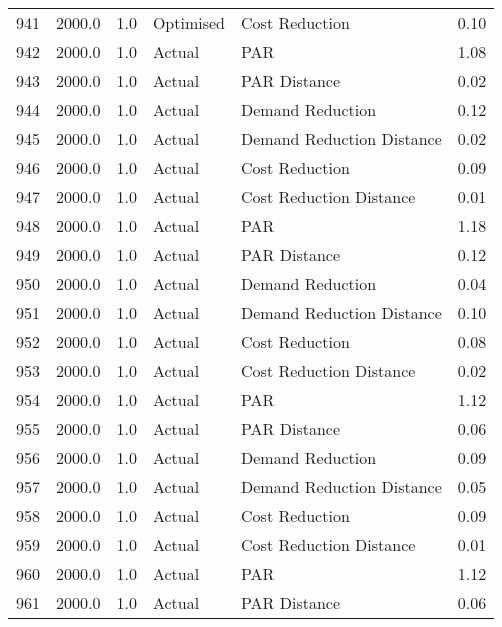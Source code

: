 \begin{longtable}{lrrllr}
941  &       2000.0 &     1.0 &      Optimised &             Cost Reduction &   0.10 \\
942  &       2000.0 &     1.0 &         Actual &                        PAR &   1.08 \\
943  &       2000.0 &     1.0 &         Actual &               PAR Distance &   0.02 \\
944  &       2000.0 &     1.0 &         Actual &           Demand Reduction &   0.12 \\
945  &       2000.0 &     1.0 &         Actual &  Demand Reduction Distance &   0.02 \\
946  &       2000.0 &     1.0 &         Actual &             Cost Reduction &   0.09 \\
947  &       2000.0 &     1.0 &         Actual &    Cost Reduction Distance &   0.01 \\
948  &       2000.0 &     1.0 &         Actual &                        PAR &   1.18 \\
949  &       2000.0 &     1.0 &         Actual &               PAR Distance &   0.12 \\
950  &       2000.0 &     1.0 &         Actual &           Demand Reduction &   0.04 \\
951  &       2000.0 &     1.0 &         Actual &  Demand Reduction Distance &   0.10 \\
952  &       2000.0 &     1.0 &         Actual &             Cost Reduction &   0.08 \\
953  &       2000.0 &     1.0 &         Actual &    Cost Reduction Distance &   0.02 \\
954  &       2000.0 &     1.0 &         Actual &                        PAR &   1.12 \\
955  &       2000.0 &     1.0 &         Actual &               PAR Distance &   0.06 \\
956  &       2000.0 &     1.0 &         Actual &           Demand Reduction &   0.09 \\
957  &       2000.0 &     1.0 &         Actual &  Demand Reduction Distance &   0.05 \\
958  &       2000.0 &     1.0 &         Actual &             Cost Reduction &   0.09 \\
959  &       2000.0 &     1.0 &         Actual &    Cost Reduction Distance &   0.01 \\
960  &       2000.0 &     1.0 &         Actual &                        PAR &   1.12 \\
961  &       2000.0 &     1.0 &         Actual &               PAR Distance &   0.06 \\

\end{longtable}
